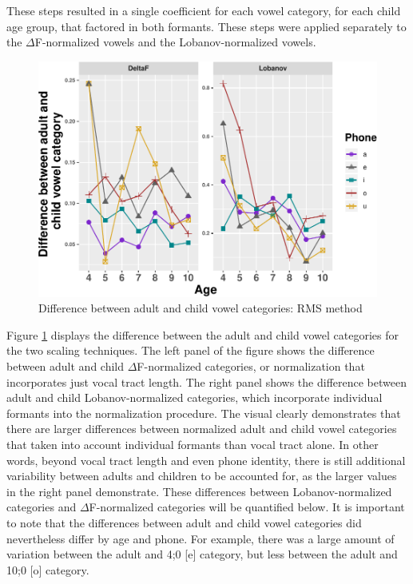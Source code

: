 \documentclass[
]{article}
\begin{document}
These steps resulted in a single coefficient for each vowel category, for each child age group, that factored in both formants. These steps were applied separately to the \(\Delta\)F-normalized vowels and the Lobanov-normalized vowels.

\begin{figure}
\centering
\includegraphics{3_vtl_results_files/figure-latex/rms-dif-figure-1.pdf}
\caption{\label{fig:rms-dif-figure}Difference between adult and child vowel categories: RMS method}
\end{figure}

Figure \ref{fig:rms-dif-figure} displays the difference between the adult and child vowel categories for the two scaling techniques. The left panel of the figure shows the difference between adult and child \(\Delta\)F-normalized categories, or normalization that incorporates just vocal tract length. The right panel shows the difference between adult and child Lobanov-normalized categories, which incorporate individual formants into the normalization procedure. The visual clearly demonstrates that there are larger differences between normalized adult and child vowel categories that taken into account individual formants than vocal tract alone. In other words, beyond vocal tract length and even phone identity, there is still additional variability between adults and children to be accounted for, as the larger values in the right panel demonstrate. These differences between Lobanov-normalized categories and \(\Delta\)F-normalized categories will be quantified below. It is important to note that the differences between adult and child vowel categories did nevertheless differ by age and phone. For example, there was a large amount of variation between the adult and 4;0 {[}e{]} category, but less between the adult and 10;0 {[}o{]} category.
\end{document}
